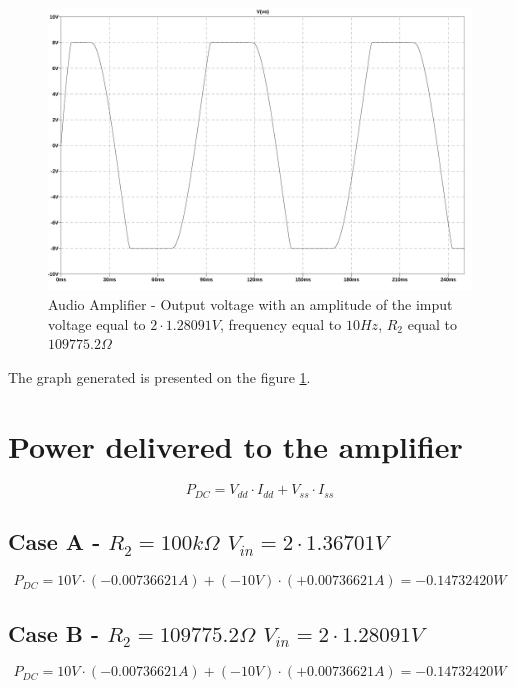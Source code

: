 \documentclass[10pt,a4paper]{book}
\begin{document}
\begin{figure}[H]
  \centering
  \includegraphics[width=14cm]{graph/1d5b.jpg}
  \caption{Audio Amplifier - Output voltage with an amplitude of the imput voltage equal to $2 \cdot 1.28091V$, frequency equal to $10Hz$, $R_2$ equal to $109775.2\Omega$}
  \label{1d5bgraph}
\end{figure}

The graph generated is presented on the figure \ref{1d5bgraph}.\\

\section{Power delivered to the amplifier}

\begin{equation}
  P_{DC} = V_{dd} \cdot I_{dd} + V_{ss} \cdot I_{ss}
\end{equation}

\subsection{Case A - $R_2 = 100k\Omega$ $V_{in} = 2 \cdot 1.36701V$}


$$P_{DC} = 10V \cdot (-0.00736621A) + (-10V) \cdot (+0.00736621 A) = -0.14732420W$$

\subsection{Case B - $R_2 = 109775.2\Omega$ $V_{in} = 2 \cdot 1.28091V$}


$$P_{DC} = 10V \cdot (-0.00736621A) + (-10V) \cdot (+0.00736621 A) = -0.14732420W$$
\end{document}
